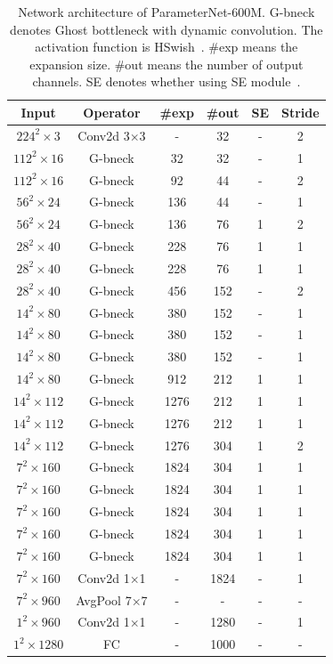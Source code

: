 \documentclass{article}
\begin{document}
\begin{appendices}
\begin{table}[h]
	\centering
	\renewcommand\arraystretch{1.05}
	\caption{Network architecture of ParameterNet-600M. G-bneck denotes Ghost bottleneck with dynamic convolution. The activation function is HSwish~\cite{mobilenetv3}. \#exp means the expansion size. \#out means the number of output channels. SE denotes whether using SE module~\cite{senet}.}
	\label{tab:GhostNet}
	\small
	\begin{tabular}{c|c|c|c|c|c}
		\hline
		Input & Operator & \#exp & \#out & SE & Stride \\ 
		\hline
		$224^2\times 3$   & Conv2d 3$\times$3 &  -  & 32     &  -  & 2 \\
		\hline
		$112^2\times 16$   & G-bneck &  32  & 32     &  -  & 1 \\
		$112^2\times 16$   & G-bneck &  92  & 44     &  -  & 2 \\
		\hline
		$56^2\times 24$   & G-bneck &  136  & 44     &  -  & 1 \\
		$56^2\times 24$   & G-bneck &  136  & 76      &  1  & 2 \\
		\hline
		$28^2\times 40$   & G-bneck &  228  & 76     &  1  & 1 \\
		$28^2\times 40$   & G-bneck &  228  & 76     &  1  & 1 \\
		$28^2\times 40$   & G-bneck &  456  & 152     &  -  & 2 \\
		\hline
		$14^2\times 80$   & G-bneck &  380  & 152     &  -  & 1 \\
		$14^2\times 80$   & G-bneck &  380  & 152    &  -  & 1 \\
		$14^2\times 80$   & G-bneck &  380  & 152    &  -  & 1 \\
		$14^2\times 80$   & G-bneck &  912  & 212     &  1  & 1 \\
		$14^2\times 112$   & G-bneck &  1276  & 212     &  1  & 1 \\
		$14^2\times 112$   & G-bneck &  1276  & 212     &  1  & 1 \\
		$14^2\times 112$   & G-bneck &  1276  & 304     &  1  & 2 \\
		\hline
		$7^2\times 160$   & G-bneck &  1824  & 304      &  1  & 1 \\
		$7^2\times 160$   & G-bneck &  1824  & 304      &  1  & 1 \\
		$7^2\times 160$   & G-bneck &  1824  & 304      &  1  & 1 \\
		$7^2\times 160$   & G-bneck &  1824  & 304      &  1  & 1 \\
		$7^2\times 160$   & G-bneck &  1824  & 304      &  1  & 1 \\
		$7^2\times 160$   & Conv2d 1$\times$1 &  - & 1824     &  -  & 1 \\
		\hline
		$7^2\times 960$   & AvgPool 7$\times$7 &  -  & -      &  -  & - \\\hline
		$1^2\times 960$   & Conv2d 1$\times$1 &  -  & 1280     &  -  & 1 \\\hline
		$1^2\times 1280$   & FC &  -  & 1000     &  -  & - \\
		\hline
	\end{tabular}
\end{table}


\end{appendices}
\end{document}
